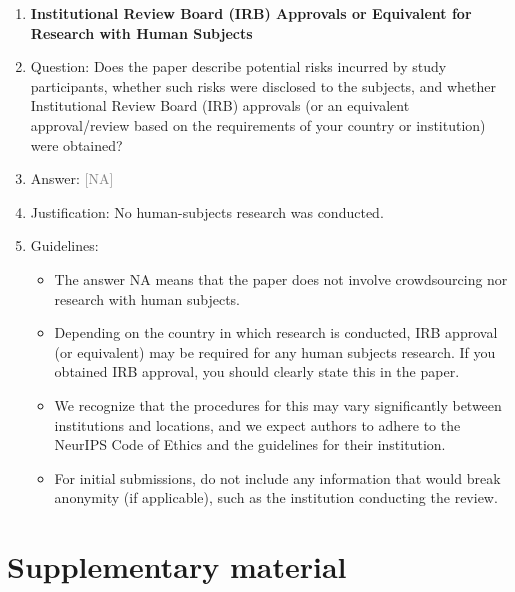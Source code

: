 \documentclass[10pt,letterpaper]{article}
\newcommand{\answerNA}[1][]{\textcolor{gray}{[NA] #1}}
\begin{document}
\begin{enumerate}
\item {\bf Institutional Review Board (IRB) Approvals or Equivalent for Research with Human Subjects}
    \item[] Question: Does the paper describe potential risks incurred by study participants, whether such risks were disclosed to the subjects, and whether Institutional Review Board (IRB) approvals (or an equivalent approval/review based on the requirements of your country or institution) were obtained?
    \item[] Answer: \answerNA{}
    \item[] Justification: No human-subjects research was conducted.
    \item[] Guidelines:
    \begin{itemize}
        \item The answer NA means that the paper does not involve crowdsourcing nor research with human subjects.
        \item Depending on the country in which research is conducted, IRB approval (or equivalent) may be required for any human subjects research. If you obtained IRB approval, you should clearly state this in the paper. 
        \item We recognize that the procedures for this may vary significantly between institutions and locations, and we expect authors to adhere to the NeurIPS Code of Ethics and the guidelines for their institution. 
        \item For initial submissions, do not include any information that would break anonymity (if applicable), such as the institution conducting the review.
    \end{itemize}

\end{enumerate}


\clearpage
\section*{Supplementary material}
\footnotesize
\end{document}

